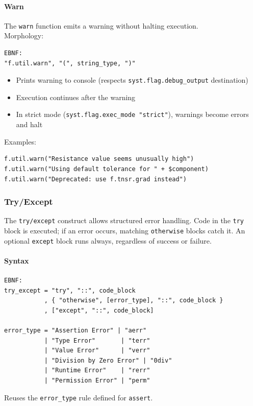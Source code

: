 \paragraph{Warn}
The \texttt{warn} function emits a warning without halting execution.\\
Morphology:
\begin{verbatim}
EBNF:
"f.util.warn", "(", string_type, ")"
\end{verbatim}
\begin{itemize}
\item Prints warning to console (respects \texttt{syst.flag.debug\_output} destination)
\item Execution continues after the warning
\item In strict mode (\texttt{syst.flag.exec\_mode "strict"}), warnings become errors and halt
\end{itemize}
Examples:
\begin{verbatim}
f.util.warn("Resistance value seems unusually high")
f.util.warn("Using default tolerance for " + $component)
f.util.warn("Deprecated: use f.tnsr.grad instead")
\end{verbatim}

\subsubsection{Try/Except}
\label{sec:try-except}
The \texttt{try/except} construct allows structured error handling. Code in the \texttt{try} block is executed; if an error occurs, matching \texttt{otherwise} blocks catch it. An optional \texttt{except} block runs always, regardless of success or failure.

\paragraph{Syntax}
\begin{verbatim}
EBNF:
try_except = "try", "::", code_block
           , { "otherwise", [error_type], "::", code_block }
           , ["except", "::", code_block]

error_type = "Assertion Error" | "aerr"
           | "Type Error"       | "terr"
           | "Value Error"      | "verr"
           | "Division by Zero Error" | "0div"
           | "Runtime Error"    | "rerr"
           | "Permission Error" | "perm"
\end{verbatim}

Reuses the \texttt{error\_type} rule defined for \texttt{assert}.

